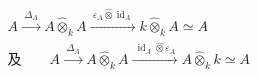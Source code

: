 \(
\begin{gathered}
A\xrightarrow{\ \Delta_A\ }A\widehat\otimes_k A
 \xrightarrow{\ \varepsilon_A\widehat\otimes\operatorname{id}_A\ }
 k\widehat\otimes_k A\simeq A
\\[.7ex]
\text{及}\qquad
A\xrightarrow{\ \Delta_A\ }A\widehat\otimes_k A
 \xrightarrow{\ \operatorname{id}_A\widehat\otimes\varepsilon_A\ }
 A\widehat\otimes_k k\simeq A
\end{gathered}
\)
